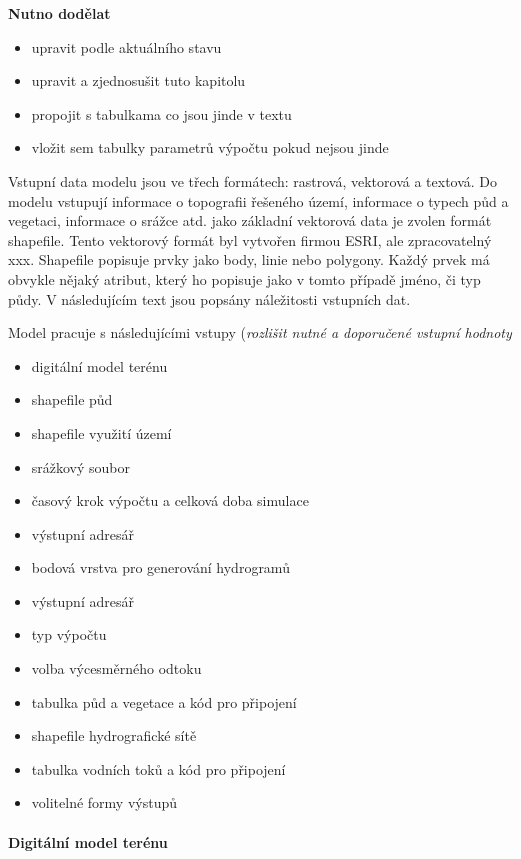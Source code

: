 
\textbf{Nutno dodělat}
\begin{itemize} \itemsep 0pt
\item upravit podle aktuálního stavu
\item upravit a zjednosušit tuto kapitolu
\item propojit s tabulkama co jsou jinde v textu
\item vložit sem tabulky parametrů výpočtu pokud nejsou jinde
\end{itemize}


Vstupní data modelu jsou ve třech formátech: rastrová, vektorová a textová. Do modelu vstupují informace o topografii řešeného území, informace o typech půd a vegetaci, informace o srážce atd. jako základní vektorová data je zvolen formát shapefile. Tento vektorový formát byl vytvořen firmou ESRI, ale zpracovatelný xxx. Shapefile popisuje prvky jako body, linie nebo polygony. Každý prvek má obvykle nějaký atribut, který ho popisuje jako v tomto případě jméno, či typ půdy. V následujícím text jsou popsány náležitosti vstupních dat. 

Model pracuje s následujícími vstupy (\textit{rozlišit nutné a doporučené vstupní hodnoty}
\begin{itemize} \itemsep 0pt
\item digitální model terénu
\item shapefile půd
\item shapefile využití území
\item srážkový soubor
\item časový krok výpočtu a celková doba simulace
\item výstupní adresář
\item bodová vrstva pro generování hydrogramů
\item výstupní adresář
\item typ výpočtu
\item volba výcesměrného odtoku
\item tabulka půd a vegetace a kód pro připojení
\item shapefile hydrografické sítě
\item tabulka vodních toků a kód pro připojení
\item volitelné formy výstupů
\end{itemize}

\paragraph{Digitální model terénu} \label{sec:vstupdmt} 


